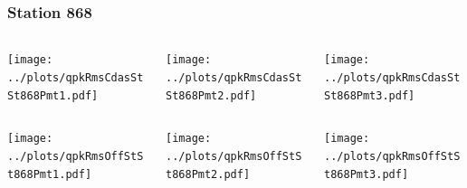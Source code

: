 \documentclass[aspectratio=169]{beamer}
\begin{document}
\begin{frame} 
  \frametitle{Station 868}
  \begin{center}
    \begin{columns}
      \begin{column}{0.33\textwidth}
        \texttt{[image: ../plots/qpkRmsCdasStSt868Pmt1.pdf]}
      \end{column}
      \begin{column}{0.33\textwidth}
        \texttt{[image: ../plots/qpkRmsCdasStSt868Pmt2.pdf]}
      \end{column}
      \begin{column}{0.33\textwidth}
        \texttt{[image: ../plots/qpkRmsCdasStSt868Pmt3.pdf]}
      \end{column}
    \end{columns}
  \end{center}

  \begin{center}
    \begin{columns}
      \begin{column}{0.33\textwidth}
        \texttt{[image: ../plots/qpkRmsOffStSt868Pmt1.pdf]}
      \end{column}
      \begin{column}{0.33\textwidth}
        \texttt{[image: ../plots/qpkRmsOffStSt868Pmt2.pdf]}
      \end{column}
      \begin{column}{0.33\textwidth}
        \texttt{[image: ../plots/qpkRmsOffStSt868Pmt3.pdf]}
      \end{column}
    \end{columns}
  \end{center}
\end{frame}
\end{document}
